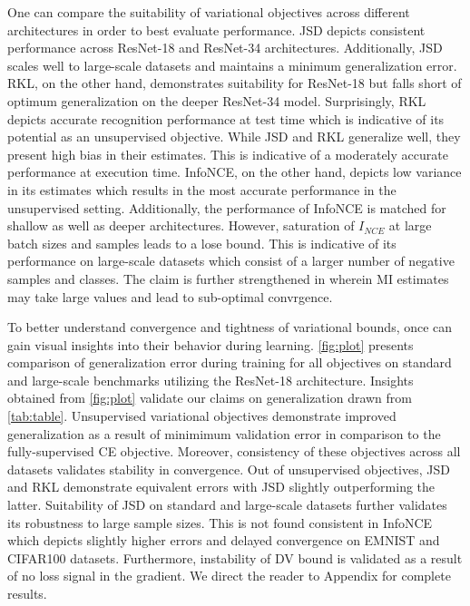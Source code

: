 \documentclass{article}
\begin{document}
One can compare the suitability of variational objectives across different architectures in order to best evaluate performance. JSD depicts consistent performance across ResNet-18 and ResNet-34 architectures. Additionally, JSD scales well to large-scale datasets and maintains a minimum generalization error. RKL, on the other hand, demonstrates suitability for ResNet-18 but falls short of optimum generalization on the deeper ResNet-34 model. Surprisingly, RKL depicts accurate recognition performance at test time which is indicative of its potential as an unsupervised objective. While JSD and RKL generalize well, they present high bias in their estimates. This is indicative of a moderately accurate performance at execution time. InfoNCE, on the other hand, depicts low variance in its estimates which results in the most accurate performance in the unsupervised setting. Additionally, the performance of InfoNCE is matched for shallow as well as deeper architectures. However, saturation of $I_{NCE}$ at large batch sizes and samples leads to a lose bound. This is indicative of its performance on large-scale datasets which consist of a larger number of negative samples and classes. The claim is further strengthened in \cite{variational} wherein MI estimates may take large values and lead to sub-optimal convrgence. 

To better understand convergence and tightness of variational bounds, once can gain visual insights into their behavior during learning. \autoref{fig:plot} presents comparison of generalization error during training for all objectives on standard and large-scale benchmarks utilizing the ResNet-18 architecture. Insights obtained from \autoref{fig:plot} validate our claims on generalization drawn from \autoref{tab:table}. Unsupervised variational objectives demonstrate improved generalization as a result of minimimum validation error in comparison to the fully-supervised CE objective. Moreover, consistency of these objectives across all datasets validates stability in convergence. Out of unsupervised objectives, JSD and RKL demonstrate equivalent errors with JSD slightly outperforming the latter. Suitability of JSD on standard and large-scale datasets further validates its robustness to large sample sizes. This is not found consistent in InfoNCE which depicts slightly higher errors and delayed convergence on EMNIST and CIFAR100 datasets. Furthermore, instability of DV bound is validated as a result of no loss signal in the gradient. We direct the reader to Appendix for complete results.  
\end{document}
